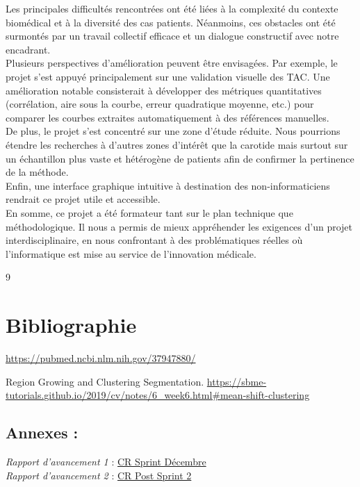 \documentclass[a4paper]{article}
\begin{document}
    \noindent
    Les principales difficultés rencontrées ont été liées à la complexité du contexte biomédical et à la diversité des cas patients. Néanmoins, ces obstacles ont été surmontés par un travail collectif efficace et un dialogue constructif avec notre encadrant. \\
    
    \noindent
    Plusieurs perspectives d'amélioration peuvent être envisagées. Par exemple, le projet s’est appuyé principalement sur une validation visuelle des TAC. Une amélioration notable consisterait à développer des métriques quantitatives (corrélation, aire sous la courbe, erreur quadratique moyenne, etc.) pour comparer les courbes extraites automatiquement à des références manuelles. \\
    De plus, le projet s’est concentré sur une zone d’étude réduite. Nous pourrions étendre les recherches à d’autres zones d'intérêt que la carotide mais surtout sur un échantillon plus vaste et hétérogène de patients afin de confirmer la pertinence de la méthode. \\
    Enfin, une interface graphique intuitive à destination des non-informaticiens rendrait ce projet utile et accessible. \\
    
    \noindent
    En somme, ce projet a été formateur tant sur le plan technique que méthodologique. Il nous a permis de mieux appréhender les exigences d’un projet interdisciplinaire, en nous confrontant à des problématiques réelles où l’informatique est mise au service de l’innovation médicale. \\




\newpage
\begin{thebibliography}{9}
\section*{Bibliographie}
\label{bibliographie}
  
  \url{https://pubmed.ncbi.nlm.nih.gov/37947880/}

Region Growing and Clustering Segmentation. \url{https://sbme-tutorials.github.io/2019/cv/notes/6_week6.html#mean-shift-clustering}

\subsection*{Annexes : }
\textit{Rapport d'avancement 1} : \href{../Rapports/Rapport_Sprint_Décembre.pdf}{CR Sprint Décembre}\\
\textit{Rapport d'avancement 2} : \href{../Rapports/Rapport_avancement_post_sprint2.pdf}{CR Post Sprint 2}\\
\end{thebibliography}

    
\end{document}

